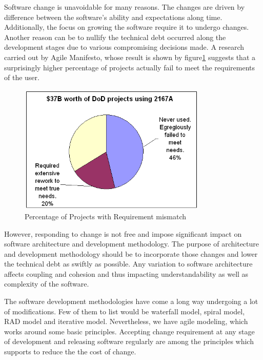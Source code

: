 Software change is unavoidable for many reasons. The changes are driven by difference between the software’s ability and expectations along time. Additionally, the focus on growing the software require it to undergo changes. Another reason can be to nullify the technical debt occurred along the development stages due to various compromising decisions made.\cite{elsevier0901}
A research carried out by Agile Manifesto, whose result is shown by figure\ref{fig:requirementmismatch} suggests that a surprisingly higher percentage of projects actually fail to meet the requirements of the user.
\begin{figure}[H]
\begin{center}
\includegraphics[width=0.8\textwidth]{figures/introduction-motivation}
\caption{Percentage of Projects with Requirement mismatch \cite{Miyachi01}}
\label{fig:requirementmismatch}
\end{center}
\end{figure}
However, responding to change is not free and impose significant impact on software architecture and development methodology. The purpose of architecture and development methodology should be to incorporate those changes and lower the technical debt as swiftly as possible.\cite{Northrop1501} Any variation to software architecture affects coupling and cohesion and thus impacting understandability as well as complexity of the software.\cite{elsevier0901}

The software development methodologies have come a long way undergoing a lot of modifications. Few of them to list would be waterfall model, spiral model, \acrshort{RAD} model and iterative model.\cite{CMS0801} Nevertheless, we have agile modeling, which works around some basic principles. Accepting change requirement at any stage of development and releasing software regularly are among the principles which supports to reduce the the cost of change.\cite{StellmanGreene1401}	

